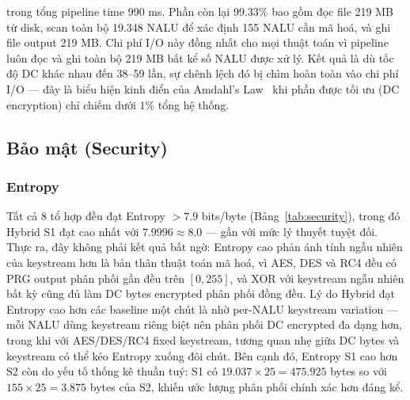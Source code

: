 trong tổng pipeline time 990 ms. Phần còn lại 99.33\% bao gồm đọc file 219 MB từ disk, scan toàn bộ 19.348 NALU để xác định 155 NALU cần mã hoá, và ghi file output 219 MB. Chi phí I/O này đồng nhất cho mọi thuật toán vì pipeline luôn đọc và ghi toàn bộ 219 MB bất kể số NALU được xử lý. Kết quả là dù tốc độ DC khác nhau đến 38--59 lần, sự chênh lệch đó bị chìm hoàn toàn vào chi phí I/O --- đây là biểu hiện kinh điển của Amdahl's Law~\cite{amdahl1967} khi phần được tối ưu (DC encryption) chỉ chiếm dưới $1\%$ tổng hệ thống.

\subsection{Bảo mật (Security)}

\subsubsection{Entropy}

Tất cả 8 tổ hợp đều đạt Entropy $> 7.9$ bits/byte (Bảng~\ref{tab:security}), trong đó Hybrid S1 đạt cao nhất với $7.9996 \approx 8.0$ --- gần với mức lý thuyết tuyệt đối. Thực ra, đây không phải kết quả bất ngờ: Entropy cao phản ánh tính ngẫu nhiên của keystream hơn là bản thân thuật toán mã hoá, vì AES, DES và RC4 đều có PRG output phân phối gần đều trên $[0, 255]$, và XOR với keystream ngẫu nhiên bất kỳ cũng đủ làm DC bytes encrypted phân phối đồng đều. Lý do Hybrid đạt Entropy cao hơn các baseline một chút là nhờ per-NALU keystream variation --- mỗi NALU dùng keystream riêng biệt nên phân phối DC encrypted đa dạng hơn, trong khi với AES/DES/RC4 fixed keystream, tương quan nhẹ giữa DC bytes và keystream có thể kéo Entropy xuống đôi chút. Bên cạnh đó, Entropy S1 cao hơn S2 còn do yếu tố thống kê thuần tuý: S1 có $19.037 \times 25 = 475.925$ bytes so với $155 \times 25 = 3.875$ bytes của S2, khiến ước lượng phân phối chính xác hơn đáng kể.

